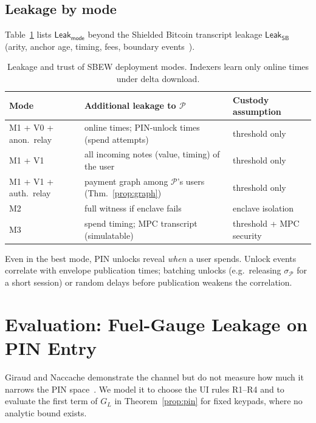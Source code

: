 \documentclass[11pt]{article}
\theoremstyle{remark}
\newcommand{\Leak}{\mathsf{Leak}}
\newcommand{\SB}{Shielded Bitcoin}
\newcommand{\sysname}{\textsf{SBEW}}
\begin{document}
\subsection{Leakage by mode}
Table~\ref{tab:leak} lists $\Leak_{\mathsf{mode}}$ beyond the \SB{} transcript leakage $\Leak_{\mathsf{SB}}$ (arity, anchor age, timing, fees, boundary events~\cite[§20.3--20.5]{sb26}).

\begin{table}[t]
\centering\small
\begin{tabularx}{\linewidth}{@{}lXX@{}}
\toprule
Mode & Additional leakage to $\mathcal{P}$ & Custody assumption \\
\midrule
M1 + V0 + anon.\ relay & online times; PIN-unlock times (spend attempts) & threshold only \\
M1 + V1 & all incoming notes (value, timing) of the user & threshold only \\
M1 + V1 + auth.\ relay & payment graph among $\mathcal{P}$'s users (Thm.~\ref{prop:graph}) & threshold only \\
M2 & full witness if enclave fails & enclave isolation \\
M3 & spend timing; MPC transcript (simulatable) & threshold + MPC security \\
\bottomrule
\end{tabularx}
\caption{Leakage and trust of \sysname{} deployment modes. Indexers learn only online times under delta download.}
\label{tab:leak}
\end{table}

Even in the best mode, PIN unlocks reveal \emph{when} a user spends. Unlock events correlate with envelope publication times; batching unlocks (e.g.\ releasing $\sigma_{\mathcal{P}}$ for a short session) or random delays before publication weakens the correlation.

\section{Evaluation: Fuel-Gauge Leakage on PIN Entry}
\label{sec:eval}

Giraud and Naccache demonstrate the channel but do not measure how much it narrows the PIN space~\cite{gn23}. We model it to choose the UI rules R1--R4 and to evaluate the first term of $G_L$ in Theorem~\ref{prop:pin} for fixed keypads, where no analytic bound exists.
\end{document}
